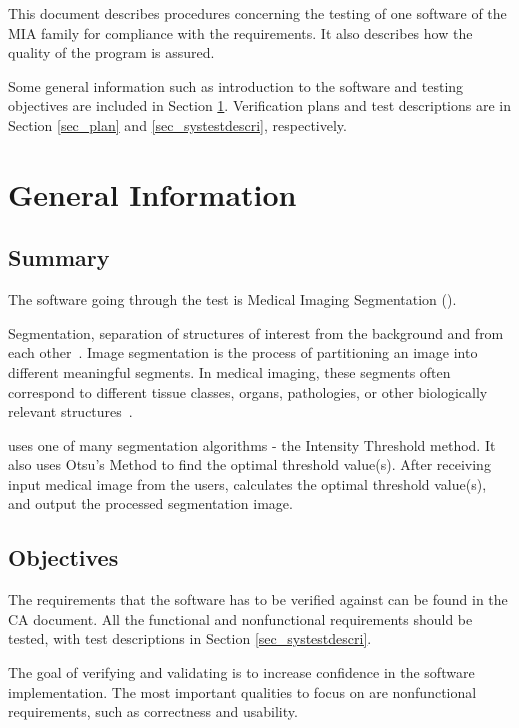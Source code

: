 \documentclass[12pt, titlepage]{article}
\begin{document}
\newpage


This document describes procedures concerning the testing of one software of the
MIA family for compliance with the requirements. It also describes how the
quality of the program is assured.

Some general information such as introduction to the software and testing
objectives are included in Section \ref{sec_geinfo}. Verification plans and test
descriptions are in Section \ref{sec_plan} and \ref{sec_systestdescri},
respectively.

\section{General Information} \label{sec_geinfo}

\subsection{Summary}

The software going through the test is Medical Imaging Segmentation (\progname{}).

Segmentation, separation of structures of interest from the background and from
each other~\cite{Bankman2000}. Image segmentation is the process of partitioning
an image into different meaningful segments. In medical imaging, these segments
often correspond to different tissue classes, organs, pathologies, or other
biologically relevant structures~\cite{Forouzanfar2010}.

\progname{} uses one of many segmentation algorithms - the Intensity Threshold
method. It also uses Otsu's Method to find the optimal threshold value(s). After
receiving input medical image from the users, \progname{} calculates the optimal
threshold value(s), and output the processed segmentation image.

\subsection{Objectives}

The requirements that the software has to be verified against can be found in
the CA document. All the functional and nonfunctional requirements should be
tested, with test descriptions in Section \ref{sec_systestdescri}.

The goal of verifying and validating is to increase confidence in the software
implementation. The most important qualities to focus on are nonfunctional
requirements, such as correctness and usability.
\end{document}
